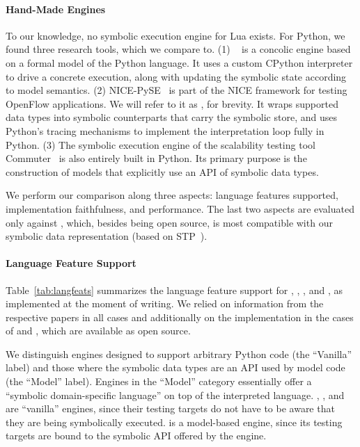 \paragraph{Hand-Made Engines}

To our knowledge, no symbolic execution engine for Lua exists.  For Python, we found three research tools, which we compare \chef to.  (1) \cutiepy~\cite{cutie-py} is a concolic engine based on a formal model of the Python language.  It uses a custom CPython interpreter to drive a concrete execution, along with updating the symbolic state according to model semantics. (2) NICE-PySE~\cite{nice} is part of the NICE framework for testing OpenFlow applications.  We will refer to it as \nicese, for brevity. It wraps supported data types into symbolic counterparts that carry the symbolic store, and uses Python's tracing mechanisms to implement the interpretation loop fully in Python.  (3) The symbolic execution engine of the scalability testing tool Commuter~\cite{commuter} is also entirely built in Python.  Its primary purpose is the construction of models that explicitly use an API of symbolic data types.

We perform our comparison along three aspects: language features supported, implementation faithfulness, and performance.  The last two aspects are evaluated only against \nicese, which, besides being open source, is most compatible with our symbolic data representation (based on STP~\cite{stp}).

\paragraph{Language Feature Support}

Table~\ref{tab:langfeats} summarizes the language feature support for \chef, \nicese, \cutiepy, and \commuterse, as implemented at the moment of writing.  We relied on information from the respective papers in all cases and additionally on the implementation in the cases of \nicese and \commuterse, which are available as open source.

We distinguish engines designed to support arbitrary Python code (the ``Vanilla'' label) and those where the symbolic data types are an API used by model code (the ``Model'' label).  Engines in the ``Model'' category essentially offer a ``symbolic domain-specific language'' on top of the interpreted language.  \chef, \cutiepy, and \nicese are ``vanilla'' engines, since their testing targets do not have to be aware that they are being symbolically executed.  \commuterse is a model-based engine, since its testing targets are bound to the symbolic API offered by the engine.

